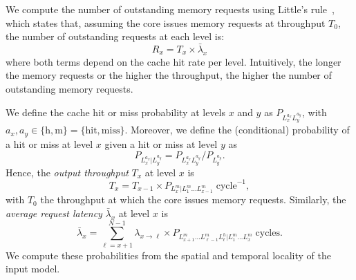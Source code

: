 We compute the number of outstanding memory requests using Little's rule~\cite{little1961proof}, which states that, assuming the core issues memory requests at throughput $T_0$, the number of outstanding requests at each level is:
\begin{equation}
\label{eq:little-rule}
R_x = T_x \times \bar{\lambda}_x
\end{equation}
where both terms depend on the cache hit rate per level. Intuitively, the longer the memory requests or the higher the throughput, the higher the number of outstanding memory requests.

We define the cache hit or miss probability at levels $x$ and $y$ as $P_{L_x^{a_x} L_y^{a_y}}$, with $a_x, a_y \in \{\text{h}, \text{m}\} = \{\text{hit}, \text{miss}\}$. Moreover, we define the (conditional) probability of a hit or miss at level $x$ given a hit or miss at level $y$ as
\begin{equation}
P_{L_x^{a_x} | L_y^{a_y}} = P_{L_x^{a_x} L_y^{a_y}} / P_{L_y^{a_y}}.
\end{equation}
Hence, the \emph{output throughput} $T_x$ at level $x$ is 
\begin{equation}
T_x = T_{x-1} \times P_{L_x^{m} | L_1^{m} \ldots L_{x-1}^{m}} \;\text{cycle}^{-1},
\end{equation}
with $T_0$ the throughput at which the core issues memory requests.
Similarly, the \emph{average request latency} $\bar{\lambda}_x$ at level $x$ is
\begin{equation}
\bar{\lambda}_x =
\sum_{\ell = x+1}^{N-1}
\lambda_{x \rightarrow \ell} \times
P_{L_{x+1}^{m} \ldots L_{\ell-1}^{m} L_{\ell}^{h} | L_1^{m} \ldots L_x^{m}} \;\text{cycles}.
\end{equation}
We compute these probabilities from the spatial and temporal locality of the input model.

